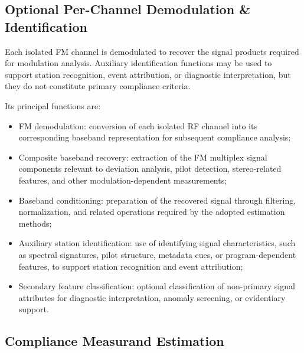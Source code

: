 \documentclass[11pt]{article}
\begin{document}
\subsection*{Optional Per-Channel Demodulation \& Identification}

Each isolated FM channel is demodulated to recover the signal products required for modulation analysis. Auxiliary identification functions may be used to support station recognition, event attribution, or diagnostic interpretation, but they do not constitute primary compliance criteria.

Its principal functions are:
\begin{itemize}
    \item FM demodulation: conversion of each isolated RF channel into its corresponding baseband representation for subsequent compliance analysis;
    \item Composite baseband recovery: extraction of the FM multiplex signal components relevant to deviation analysis, pilot detection, stereo-related features, and other modulation-dependent measurements;
    \item Baseband conditioning: preparation of the recovered signal through filtering, normalization, and related operations required by the adopted estimation methods;
    \item Auxiliary station identification: use of identifying signal characteristics, such as spectral signatures, pilot structure, metadata cues, or program-dependent features, to support station recognition and event attribution;
    \item Secondary feature classification: optional classification of non-primary signal attributes for diagnostic interpretation, anomaly screening, or evidentiary support.
\end{itemize}

\subsection*{Compliance Measurand Estimation}
\end{document}
